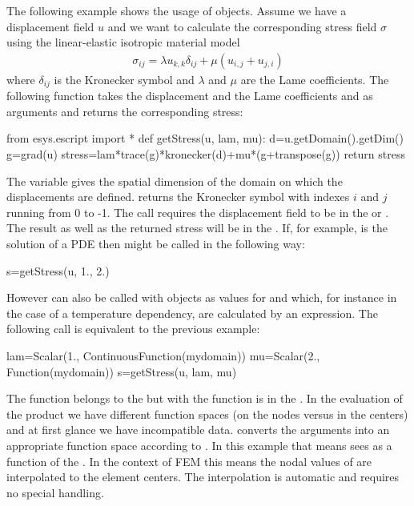 The following example shows the usage of \Data objects. Assume we have a
displacement field $u$ and we want to calculate the corresponding stress field
$\sigma$ using the linear-elastic isotropic material model
\begin{eqnarray}\label{eq: linear elastic stress}
\sigma_{ij}=\lambda u_{k,k} \delta_{ij} + \mu ( u_{i,j} + u_{j,i})
\end{eqnarray}
where $\delta_{ij}$ is the Kronecker symbol and
$\lambda$ and $\mu$ are the Lame coefficients. The following function
takes the displacement  and the Lame coefficients  and 
as arguments and returns the corresponding stress:
\begin{python}
  from esys.escript import *
  def getStress(u, lam, mu):
    d=u.getDomain().getDim()
    g=grad(u)
    stress=lam*trace(g)*kronecker(d)+mu*(g+transpose(g))
    return stress
\end{python}
The variable  gives the spatial dimension of the domain on which the
displacements are defined.
 returns the Kronecker symbol with indexes $i$ and $j$ running
from 0 to -1.
The call  requires the displacement field  to be in
the  or \ContinuousFunction.
The result  as well as the returned stress will be in the \Function.
If, for example,  is the solution of a PDE then  might
be called in the following way:
\begin{python}
  s=getStress(u, 1., 2.)
\end{python}
However  can also be called with \Data objects as values for
 and  which, for instance in the case of a temperature
dependency, are calculated by an expression.
The following call is equivalent to the previous example:
\begin{python}
  lam=Scalar(1., ContinuousFunction(mydomain))
  mu=Scalar(2., Function(mydomain))
  s=getStress(u, lam, mu)
\end{python}
%
The function  belongs to the \ContinuousFunction but with  the
function  is in the \Function.
In the evaluation of the product  we have different function
spaces (on the nodes versus in the centers) and at first glance we have incompatible data.
\escript converts the arguments into an appropriate function space according
to .
In this example that means \escript sees  as a function of the \Function.
In the context of FEM this means the nodal values of  are
interpolated to the element centers.
The interpolation is automatic and requires no special handling.

